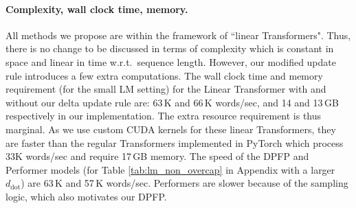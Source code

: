 \documentclass{article}
\theoremstyle{definition}
\begin{document}
\paragraph{Complexity, wall clock time, memory.}
All methods we propose are within the framework of ``linear Transformers".
Thus, there is no change to be discussed in terms of complexity
which is constant in space and linear in time w.r.t.~sequence length.
However, our modified update rule introduces a few extra computations.
The wall clock time and memory requirement (for the small LM setting)
for the Linear Transformer with and without our delta
update rule are: 63\,K and 66\,K words/sec, and 14 and 13\,GB respectively in our implementation.
The extra resource requirement is thus marginal.
As we use custom CUDA kernels for these linear Transformers,
they are faster than the regular Transformers implemented in PyTorch which process 33K words/sec and require 17\,GB memory.
The speed of the DPFP and Performer models (for Table \ref{tab:lm_non_overcap} in Appendix with a larger $d_\text{dot}$) are 63\,K and 57\,K words/sec.
Performers are slower because of the sampling logic,
which also motivates our DPFP.
\end{document}
